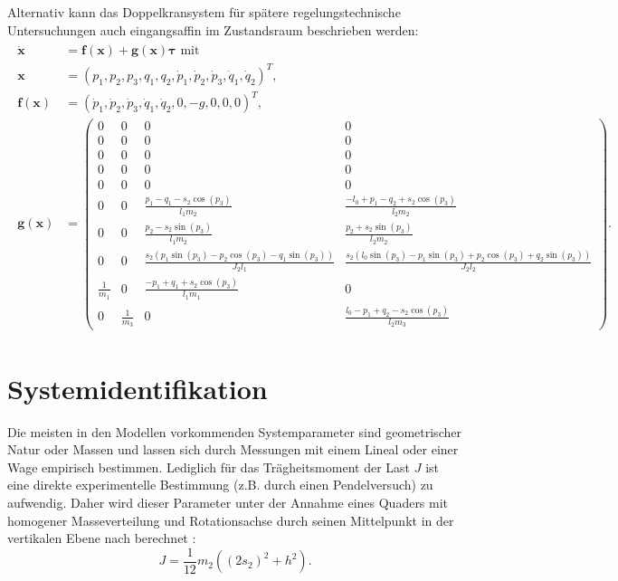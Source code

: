 Alternativ kann das Doppelkransystem für spätere regelungstechnische Untersuchungen auch eingangsaffin im Zustandsraum beschrieben werden:
\begin{align}
\label{eq:state_space_double_crane}
\begin{split}
\dot{\mathbf{x}} &= \mathbf{f}(\mathbf{x}) + \mathbf{g}(\mathbf{x}) \boldsymbol{\tau} \text{ mit } \\ 
\mathbf{x} &= (p_{1},	p_{2}, p_{3}, q_{1}, q_{2}, \dot{p}_{1}, \dot{p}_{2}, \dot{p}_{3}, \dot{q}_{1}, \dot{q}_{2})^T, \\
\mathbf{f}(\mathbf{x}) &= 
(\dot{p}_{1}, \dot{p}_{2}, \dot{p}_{3}, \dot{q}_{1}, \dot{q}_{2}, 0, -g, 0, 0, 0)^T, \\ 
\mathbf{g}(\mathbf{x}) &=
\left(\begin{smallmatrix}
0 & 0 & 0 & 0\\
0 & 0 & 0 & 0\\
0 & 0 & 0 & 0\\
0 & 0 & 0 & 0\\
0 & 0 & 0 & 0\\
0 & 0 & \frac{p_{1} - q_{1} - s_{2} \cos{\left(p_{3} \right)}}{l_{1} m_{2}} & \frac{- l_{0} + p_{1} - q_{2} + s_{2} \cos{\left(p_{3} \right)}}{l_{2} m_{2}}\\
0 & 0 & \frac{p_{2} - s_{2} \sin{\left(p_{3} \right)}}{l_{1} m_{2}} & \frac{p_{2} + s_{2} \sin{\left(p_{3} \right)}}{l_{2} m_{2}}\\
0 & 0 & \frac{s_{2} \left(p_{1} \sin{\left(p_{3} \right)} - p_{2} \cos{\left(p_{3} \right)} - q_{1} \sin{\left(p_{3} \right)}\right)}{J_{2} l_{1}} & \frac{s_{2} \left(l_{0} \sin{\left(p_{3} \right)} - p_{1} \sin{\left(p_{3} \right)} + p_{2} \cos{\left(p_{3} \right)} + q_{2} \sin{\left(p_{3} \right)}\right)}{J_{2} l_{2}}\\
\frac{1}{m_{1}} & 0 & \frac{- p_{1} + q_{1} + s_{2} \cos{\left(p_{3} \right)}}{l_{1} m_{1}} & 0\\
0 & \frac{1}{m_{3}} & 0 & \frac{l_{0} - p_{1} + q_{2} - s_{2} \cos{\left(p_{3} \right)}}{l_{2} m_{3}}
\end{smallmatrix}\right).
\end{split}
\end{align}

\section{Systemidentifikation}
\label{sec:SysIdent}

Die meisten in den Modellen vorkommenden Systemparameter sind geometrischer Natur oder Massen und lassen sich durch Messungen mit einem Lineal oder einer Wage empirisch bestimmen. Lediglich für das Trägheitsmoment der Last $J$ ist eine direkte experimentelle Bestimmung (z.B. durch einen Pendelversuch) zu aufwendig. Daher wird dieser Parameter unter der Annahme eines Quaders mit homogener Masseverteilung und Rotationsachse durch seinen Mittelpunkt in der vertikalen Ebene nach \cite{LastTraegheit} berechnet :
\begin{equation}
	J = \frac{1}{12} m_2 ((2 s_2)^2 + h^2).
\end{equation}

